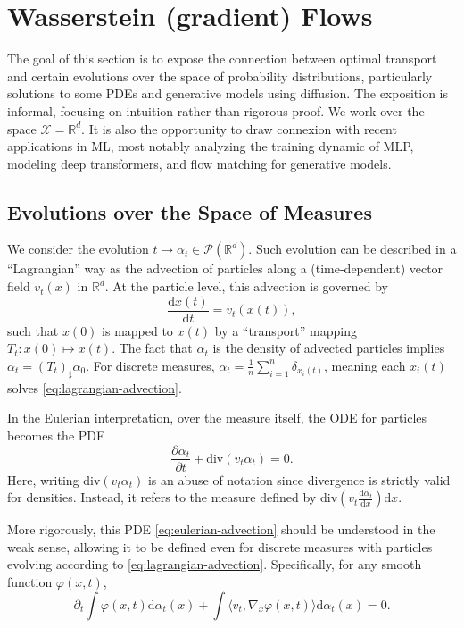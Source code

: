 \section{Wasserstein (gradient) Flows}

The goal of this section is to expose the connection between optimal transport and certain evolutions over the space of probability distributions, particularly solutions to some PDEs and generative models using diffusion. The exposition is informal, focusing on intuition rather than rigorous proof. We work over the space $\mathcal{X} = \mathbb{R}^d$. It is also the opportunity to draw connexion with recent applications in ML, most notably analyzing the training dynamic of MLP, modeling deep transformers, and flow matching for generative models.

\subsection{Evolutions over the Space of Measures}

We consider the evolution $t \mapsto \alpha_t \in \mathcal{P}(\mathbb{R}^d)$. Such evolution can be described in a ``Lagrangian'' way as the advection of particles along a (time-dependent) vector field $v_t(x)$ in $\mathbb{R}^d$. At the particle level, this advection is governed by 
\begin{equation}
    \frac{\mathrm{d}x(t)}{\mathrm{d}t} = v_t(x(t)), \label{eq:lagrangian-advection}
\end{equation}
such that $x(0)$ is mapped to $x(t)$ by a ``transport'' mapping $T_t : x(0) \mapsto x(t)$. The fact that $\alpha_t$ is the density of advected particles implies $\alpha_t = (T_t)_\sharp \alpha_0$. For discrete measures, $\alpha_t = \frac{1}{n} \sum_{i=1}^n \delta_{x_i(t)}$, meaning each $x_i(t)$ solves \eqref{eq:lagrangian-advection}.

In the Eulerian interpretation, over the measure itself, the ODE for particles becomes the PDE
\begin{equation}
    \frac{\partial \alpha_t}{\partial t} + \mathrm{div}(v_t \alpha_t) = 0. \label{eq:eulerian-advection}
\end{equation}
Here, writing $\mathrm{div}(v_t \alpha_t)$ is an abuse of notation since divergence is strictly valid for densities. Instead, it refers to the measure defined by $\mathrm{div}\left(v_t \frac{\mathrm{d} \alpha_t}{\mathrm{d} x}\right) \mathrm{d}x$.

More rigorously, this PDE \eqref{eq:eulerian-advection} should be understood in the weak sense, allowing it to be defined even for discrete measures with particles evolving according to \eqref{eq:lagrangian-advection}. Specifically, for any smooth function $\varphi(x, t)$,
\begin{equation}
    \partial_t \int \varphi(x, t) \mathrm{d} \alpha_t(x) 
    + \int \langle v_t, \nabla_x \varphi(x, t) \rangle \mathrm{d} \alpha_t(x) = 0.
\end{equation}

